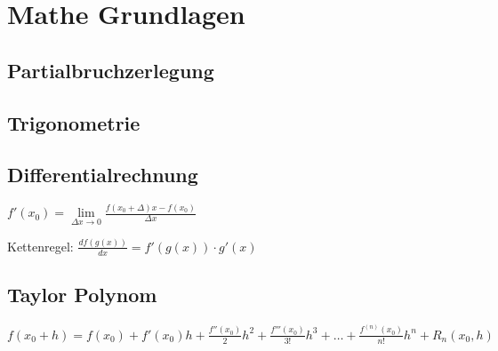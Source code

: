 \section{Mathe Grundlagen}	

	\subsection{Partialbruchzerlegung}
		
			
	\subsection{Trigonometrie}
			

	\subsection{Differentialrechnung}
		$f'(x_0)=\lim\limits_{\Delta x\rightarrow 0} \frac{f(x_0+\Delta) x-f(x_0)}{\Delta x}$	
		
		Kettenregel: $\frac{d f(g(x))}{dx} = f'(g(x)) \cdot g'(x)$
			
	\subsection{Taylor Polynom}
		$f(x_0+h)=f(x_0) + f'(x_0)h + \frac{f''(x_0)}{2}h^2 + \frac{f'''(x_0)}{3!}h^3 + \ldots + \frac{f^{(n)}(x_0)}{n!}h^n + R_n(x_0, h)$

